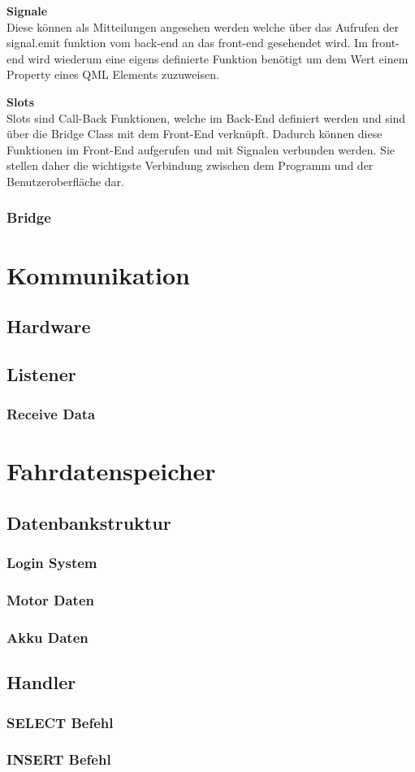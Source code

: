 \textbf{Signale}\\ \medskip
Diese können als Mitteilungen angesehen werden welche über das Aufrufen der signal.emit funktion vom back-end an das front-end gesehendet wird. Im front-end wird wiederum eine eigens definierte Funktion benötigt um dem Wert einem Property eines QML Elements zuzuweisen.
\medskip

\textbf{Slots}\\ \medskip
Slots sind Call-Back Funktionen, welche im Back-End definiert werden und sind über die Bridge Class mit dem Front-End verknüpft. Dadurch können diese Funktionen im Front-End aufgerufen und mit Signalen verbunden werden. Sie stellen daher die wichtigste Verbindung zwischen dem Programm und der Benutzeroberfläche dar.
	
\subsubsection{Bridge}

\newpage


\section{Kommunikation}
\subsection{Hardware}
\subsection{Listener}
\subsubsection{Receive Data}

\newpage


\section{Fahrdatenspeicher}
\subsection{Datenbankstruktur}
\subsubsection{Login System}
\subsubsection{Motor Daten}
\subsubsection{Akku Daten}
\subsection{Handler}
\subsubsection{SELECT Befehl}
\subsubsection{INSERT Befehl}

\newpage